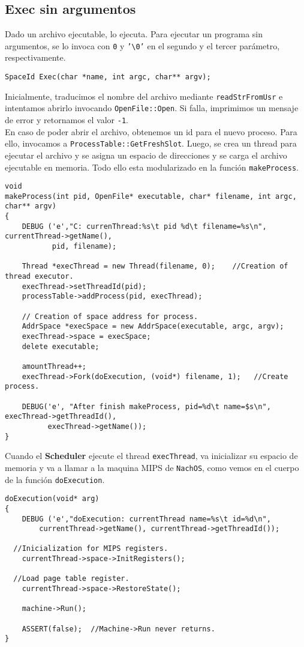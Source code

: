 \subsection*{Exec sin argumentos} \label{exec_without_args}
Dado un archivo ejecutable, lo ejecuta. Para ejecutar un programa sin argumentos, se lo invoca con \texttt{0} y \texttt{'\textbackslash 0'} en el segundo y el tercer parámetro, respectivamente.
\begin{lstlisting}[style=C]
SpaceId Exec(char *name, int argc, char** argv);
\end{lstlisting}
Inicialmente, traducimos el nombre del archivo mediante \texttt{readStrFromUsr} e intentamos abrirlo invocando \texttt{OpenFile::Open}. Si falla, imprimimos un mensaje de error y retornamos el valor \texttt{-1}.\\
En caso de poder abrir el archivo, obtenemos un id para el nuevo proceso. Para ello, invocamos a \texttt{ProcessTable::GetFreshSlot}. Luego, se crea un thread para ejecutar el archivo y se asigna un espacio de direcciones y se carga el archivo ejecutable en memoria. Todo ello esta modularizado en la función \texttt{makeProcess}.\\
\begin{lstlisting}[style=C]
void
makeProcess(int pid, OpenFile* executable, char* filename, int argc, char** argv)
{
    DEBUG ('e',"C: currenThread:%s\t pid %d\t filename=%s\n", currentThread->getName(),
           pid, filename);
    
    Thread *execThread = new Thread(filename, 0);    //Creation of thread executor.
    execThread->setThreadId(pid);
    processTable->addProcess(pid, execThread);

    // Creation of space address for process.
    AddrSpace *execSpace = new AddrSpace(executable, argc, argv);
    execThread->space = execSpace;
    delete executable;

    amountThread++;
    execThread->Fork(doExecution, (void*) filename, 1);   //Create process.

    DEBUG('e', "After finish makeProcess, pid=%d\t name=$s\n", execThread->getThreadId(),
          execThread->getName());
}
\end{lstlisting}
Cuando el \textbf{Scheduler} ejecute el thread \texttt{execThread}, va inicializar su espacio de memoria y va a llamar a la maquina MIPS de \texttt{NachOS}, como vemos en el cuerpo de la función \texttt{doExecution}.
\begin{lstlisting}[style=C]
doExecution(void* arg)
{
    DEBUG ('e',"doExecution: currentThread name=%s\t id=%d\n",
        currentThread->getName(), currentThread->getThreadId());

  //Inicialization for MIPS registers.
	currentThread->space->InitRegisters();
	
  //Load page table register.
	currentThread->space->RestoreState();  

 	machine->Run();	

    ASSERT(false);  //Machine->Run never returns.
}
\end{lstlisting}
